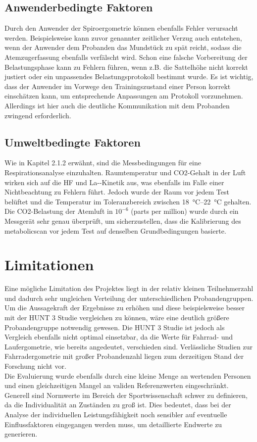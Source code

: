 \subsection{Anwenderbedingte Faktoren}
%
Durch den Anwender der Spiroergometrie können ebenfalls Fehler verursacht werden. Beispielsweise kann zuvor genannter zeitlicher Verzug auch entstehen, wenn der Anwender dem Probanden das Mundstück zu spät reicht, sodass die Atemzugerfassung ebenfalls verfälscht wird. Schon eine falsche Vorbereitung der Belastungsphase kann zu Fehlern führen, wenn z.B. die Sattelhöhe nicht korrekt justiert oder ein unpassendes Belastungsprotokoll bestimmt wurde. Es ist wichtig, dass der Anwender im Vorwege den Trainingszustand einer Person korrekt einschätzen kann, um entsprechende Anpassungen am Protokoll vorzunehmen. Allerdings ist hier auch die deutliche Kommunikation mit dem Probanden zwingend erforderlich.
%
\subsection{Umweltbedingte Faktoren}
%
Wie in Kapitel 2.1.2 erwähnt, sind die Messbedingungen für eine Respirationsanalyse einzuhalten. Raumtemperatur und \gls{CO2}-Gehalt in der Luft wirken sich auf die \gls{HF} und \gls{La-}-Kinetik aus, was ebenfalls im Falle einer Nichtbeachtung zu Fehlern führt. Jedoch wurde der Raum vor jedem Test belüftet und die Temperatur im Toleranzbereich zwischen \SIrange{18}{22}{\degreeCelsius} gehalten. Die \gls{CO2}-Belastung der Atemluft in $10^{-6}$ (parts per million) wurde durch ein Messgerät sehr genau überprüft, um sicherzustellen, dass die Kalibrierung des metabolicscan vor jedem Test auf denselben Grundbedingungen basierte.
%
\section{Limitationen}
%
Eine mögliche Limitation des Projektes liegt in der relativ kleinen Teilnehmerzahl und dadurch sehr ungleichen Verteilung der unterschiedlichen Probandengruppen. Um die Aussagekraft der Ergebnisse zu erhöhen und diese beispielsweise besser mit der HUNT 3 Studie vergleichen zu können, wäre eine deutlich größere Probandengruppe notwendig gewesen. Die HUNT 3 Studie ist jedoch als Vergleich ebenfalls nicht optimal einsetzbar, da die Werte für Fahrrad- und Laufergometrie, wie bereits angedeutet, verschieden sind. Verlässliche Studien zur Fahrradergometrie mit großer Probandenzahl liegen zum derzeitigen Stand der Forschung nicht vor.\\
Die Evaluierung wurde ebenfalls durch eine kleine Menge an wertenden Personen und einen gleichzeitigen Mangel an validen Referenzwerten eingeschränkt. Generell sind Normwerte im Bereich der Sportwissenschaft schwer zu definieren, da die Individualität an Zuständen zu groß ist. Dies bedeutet, dass bei der Analyse der individuellen Leistungsfähigkeit noch sensibler auf eventuelle Einflussfaktoren eingegangen werden muss, um detaillierte Endwerte zu generieren.
%
